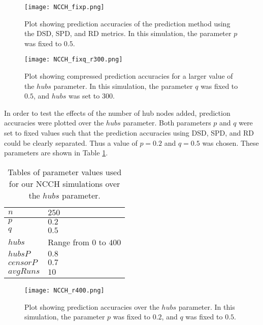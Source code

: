 \begin{figure}[h!]
\centering
\texttt{[image: NCCH\_fixp.png]}
\caption{Plot showing prediction accuracies of the prediction method using the DSD, SPD, and RD metrics. In this simulation, the parameter $p$ was fixed to $0.5$.}
\label{fig:NCCH_fixp}
\end{figure}

\begin{figure}[h!]
\centering
\texttt{[image: NCCH\_fixq\_r300.png]}
\caption{Plot showing compressed prediction accuracies for a larger value of the $hubs$ parameter. In this simulation, the parameter $q$ was fixed to $0.5$, and $hubs$ was set to $300$.}
\label{fig:NCCH_fixq_r300}
\end{figure}

In order to test the effects of the number of hub nodes added, 
prediction accuracies were plotted over the $hubs$ parameter. Both 
parameters $p$ and $q$ were set to fixed values such that the prediction
accuracies using DSD, SPD, and RD could be clearly separated. Thus a value
of $p=0.2$ and $q=0.5$ was chosen. These parameters are shown in Table 
\ref{table:NCCH-params-r}.

\begin{table}[h!]
\centering
\begin{tabular}{|l|l|}
\hline
$n$ & $250$ \\ \hline
$p$ & $0.2$\\ \hline
$q$ & $0.5$\\ \hline
$hubs$ & Range from $0$ to $400$\\ \hline
$hubsP$ & $0.8$\\ \hline
$censorP$ & $0.7$\\ \hline
$avgRuns$ & $10$\\ \hline
\end{tabular}
\caption{Tables of parameter values used for our NCCH simulations over the $hubs$ parameter.}
\label{table:NCCH-params-r}
\end{table}

\begin{figure}[h!]
\centering
\texttt{[image: NCCH\_r400.png]}
\caption{Plot showing prediction accuracies over the $hubs$ parameter. In this simulation, the parameter $p$ was fixed to $0.2$, and $q$ was fixed to $0.5$.}
\label{fig:NCCH_r400}
\end{figure}

